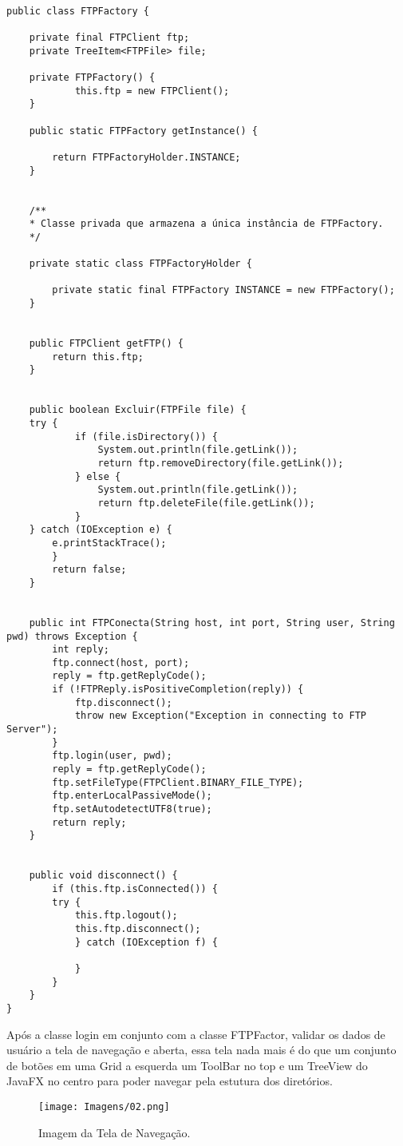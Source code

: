 \documentclass[12pt]{article}
\begin{document}
\begin{lstlisting}

public class FTPFactory {
	
	private final FTPClient ftp;
	private TreeItem<FTPFile> file;
		
	private FTPFactory() {
			this.ftp = new FTPClient();
	}
	
	public static FTPFactory getInstance() {
	
		return FTPFactoryHolder.INSTANCE;
	}


	/**
	* Classe privada que armazena a única instância de FTPFactory.
	*/
	
	private static class FTPFactoryHolder {
	
		private static final FTPFactory INSTANCE = new FTPFactory();
	}


	public FTPClient getFTP() {
		return this.ftp;
	}


	public boolean Excluir(FTPFile file) {
	try {
			if (file.isDirectory()) {
				System.out.println(file.getLink());
				return ftp.removeDirectory(file.getLink());
			} else {
				System.out.println(file.getLink());
				return ftp.deleteFile(file.getLink());
			}
	} catch (IOException e) {
		e.printStackTrace();
		}	
		return false;
	}


	public int FTPConecta(String host, int port, String user, String pwd) throws Exception {
		int reply;
		ftp.connect(host, port);
		reply = ftp.getReplyCode();
		if (!FTPReply.isPositiveCompletion(reply)) {
			ftp.disconnect();
			throw new Exception("Exception in connecting to FTP Server");
		}
		ftp.login(user, pwd);
		reply = ftp.getReplyCode();
		ftp.setFileType(FTPClient.BINARY_FILE_TYPE);
		ftp.enterLocalPassiveMode();
		ftp.setAutodetectUTF8(true);
		return reply;
	}


	public void disconnect() {
		if (this.ftp.isConnected()) {
		try {
			this.ftp.logout();
			this.ftp.disconnect();
			} catch (IOException f) {
	
			}
	    }
	}
}	

\end{lstlisting}

Após a classe login em conjunto com a classe FTPFactor, validar os dados de usuário a tela de navegação e aberta, essa tela nada mais é do que um conjunto de botões em uma Grid a esquerda um ToolBar no top e um TreeView do JavaFX no centro para poder navegar pela estutura dos diretórios.

\begin{figure}[H]
	\centering
	\texttt{[image: Imagens/02.png]}
	\caption{ Imagem da Tela de Navegação.}
	\label{fig:03}
\end{figure}
\end{document}
